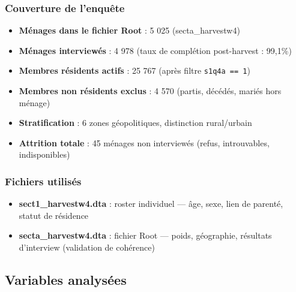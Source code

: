 \documentclass[
  10pt,
]{article}
\providecommand{\tightlist}{%
  \setlength{\itemsep}{0pt}\setlength{\parskip}{0pt}}\usepackage{longtable,booktabs,array}
\begin{document}
\subsubsection{Couverture de l'enquête}\label{couverture-de-lenquuxeate}

\begin{itemize}
\tightlist
\item
  \textbf{Ménages dans le fichier Root} : 5 025 (secta\_harvestw4)
\item
  \textbf{Ménages interviewés} : 4 978 (taux de complétion post-harvest
  : 99,1\%)
\item
  \textbf{Membres résidents actifs} : 25 767 (après filtre
  \texttt{s1q4a\ ==\ 1})
\item
  \textbf{Membres non résidents exclus} : 4 570 (partis, décédés, mariés
  hors ménage)
\item
  \textbf{Stratification} : 6 zones géopolitiques, distinction
  rural/urbain
\item
  \textbf{Attrition totale} : 45 ménages non interviewés (refus,
  introuvables, indisponibles)
\end{itemize}

\subsubsection{Fichiers utilisés}\label{fichiers-utilisuxe9s}

\begin{itemize}
\tightlist
\item
  \textbf{sect1\_harvestw4.dta} : roster individuel --- âge, sexe, lien
  de parenté, statut de résidence
\item
  \textbf{secta\_harvestw4.dta} : fichier Root --- poids, géographie,
  résultats d'interview (validation de cohérence)
\end{itemize}

\subsection{Variables analysées}\label{variables-analysuxe9es}
\end{document}
